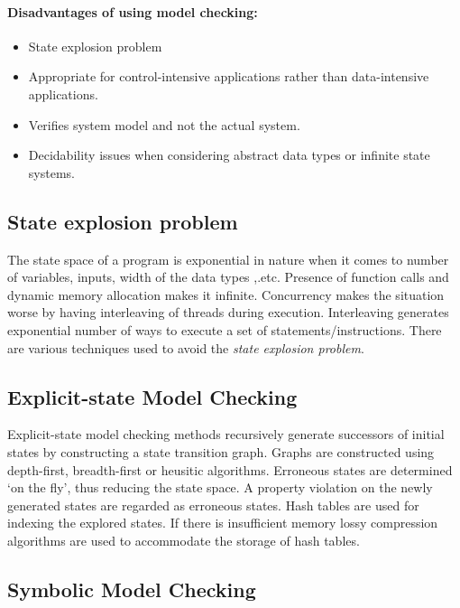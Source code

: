 \paragraph{Disadvantages of using model checking:}
\begin{itemize}
\item	State explosion problem
\item	Appropriate for control-intensive applications rather than data-intensive applications. 
\item	Verifies system model and not the actual system. 
\item	Decidability issues when considering abstract data types or infinite state systems.
\end{itemize}

\subsection{State explosion problem \label{state_exp_prob}}

The state space of a program is exponential in nature when it comes to number of variables, inputs, width of the data types ,.etc. 
Presence of function calls and dynamic memory allocation makes it infinite\cite{d2008survey}. 
Concurrency makes the situation worse by having interleaving of threads during execution. 
Interleaving generates exponential number of ways to execute a set of statements/instructions. 
There are various techniques used to avoid the \emph{state explosion problem}. 
 
\subsection{Explicit-state Model Checking}

Explicit-state model checking methods recursively generate successors of initial states by constructing a state transition graph. 
Graphs are constructed using depth-first, breadth-first or heusitic algorithms. 
Erroneous states are determined `on the fly', thus reducing the state space. 
A property violation on the newly generated states are regarded as erroneous states. 
Hash tables are used for indexing the explored states. 
If there is insufficient memory lossy compression algorithms are used to accommodate the storage of hash tables\cite{d2008survey}. 

\subsection{Symbolic Model Checking}



